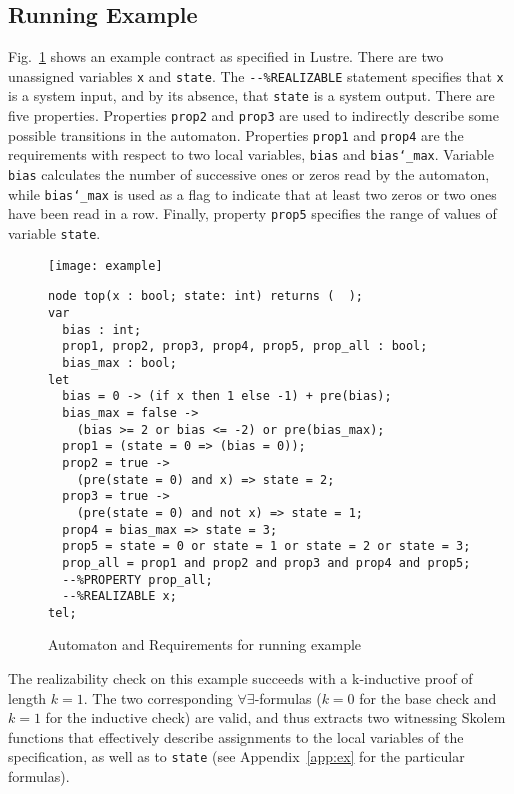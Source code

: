 \subsection{Running Example} 
 
Fig.~\ref{fg:example} shows an example contract as specified in
Lustre. There are two unassigned variables \texttt{x} and
\texttt{state}. The \texttt{{-}{-}\%REALIZABLE} statement specifies
that \texttt{x} is a system input, and by its absence, that
\texttt{state} is a system output. There are five properties.
Properties \texttt{prop2} and \texttt{prop3} are used to indirectly
describe some possible transitions in the automaton. Properties
\texttt{prop1} and \texttt{prop4} are the requirements with respect to
two local variables, \texttt{bias} and \texttt{bias\char`_max}.
Variable \texttt{bias} calculates the number of successive ones or
zeros read by the automaton, while \texttt{bias\char`_max} is used as
a flag to indicate that at least two zeros or two ones have been read
in a row. Finally, property \texttt{prop5} specifies the range of
values of variable \texttt{state}.
 
\begin{figure}[tb]
\begin{minipage}[c]{0.35\textwidth}
\centering
\texttt{[image: example]}
\end{minipage}
\begin{minipage}[c]{0.7\textwidth}
 \begin{Verbatim}[fontsize=\scriptsize]
node top(x : bool; state: int) returns (  );
var
  bias : int;
  prop1, prop2, prop3, prop4, prop5, prop_all : bool;
  bias_max : bool;
let
  bias = 0 -> (if x then 1 else -1) + pre(bias);
  bias_max = false ->
	(bias >= 2 or bias <= -2) or pre(bias_max);
  prop1 = (state = 0 => (bias = 0));
  prop2 = true ->
  	(pre(state = 0) and x) => state = 2;
  prop3 = true ->
  	(pre(state = 0) and not x) => state = 1;
  prop4 = bias_max => state = 3;
  prop5 = state = 0 or state = 1 or state = 2 or state = 3;
  prop_all = prop1 and prop2 and prop3 and prop4 and prop5;
  --%PROPERTY prop_all;
  --%REALIZABLE x;
tel;
 \end{Verbatim}
\end{minipage}
\caption{Automaton and Requirements for running example}
\label{fg:example}
\end{figure}

The realizability check on this example succeeds with a k-inductive
proof of length $k = 1$. The two corresponding
$\forall\exists$-formulas ($k=0$ for the base check and $k=1$ for the
inductive check) are valid, and thus \aeval extracts two witnessing
Skolem functions that effectively describe assignments to the local
variables of the specification, as well as to \texttt{state} (see
Appendix~\ref{app:ex} for the particular formulas).

